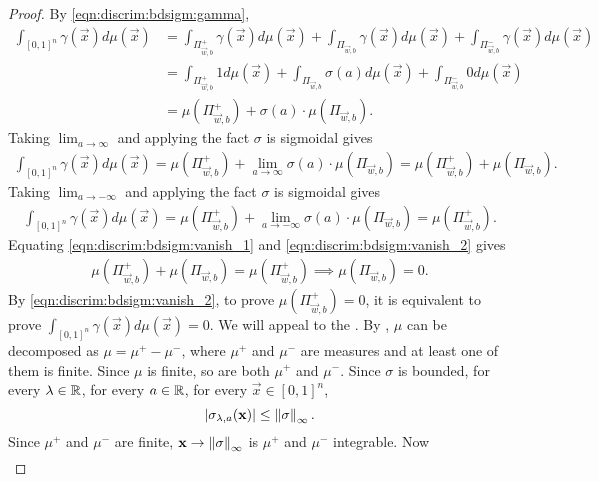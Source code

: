\begin{proof}
By \ref{eqn:discrim:bdsigm:gamma}, \begin{align*}
    \int_{[0,1]^n} \gamma(\vec{x}) d \mu  (\vec{x}) &= \int_{\Pi_{\vec{w}, b}^{+}} \gamma(\vec{x}) d \mu  (\vec{x})  + \int_{\Pi_{\vec{w}, b}} \gamma(\vec{x}) d \mu  (\vec{x})  + \int_{\Pi_{\vec{w}, b}^{-}} \gamma(\vec{x}) d \mu  (\vec{x})  & \\
                                                    &=\int_{\Pi_{\vec{w}, b}^{+}} 1 d \mu  (\vec{x})  + \int_{\Pi_{\vec{w}, b}} \sigma(a) d \mu  (\vec{x})  + \int_{\Pi_{\vec{w}, b}^{-}} 0 d \mu  (\vec{x})  & \\
                                                   &= \mu(\Pi_{\vec{w}, b}^{+}) + \sigma(a) \cdot \mu (\Pi_{\vec{w}, b}).
\end{align*}
Taking $\lim_{a \to \infty}$ and applying the fact $\sigma$ is sigmoidal gives
\begin{align}
      \label{eqn:discrim:bdsigm:vanish_1}
      \int_{[0,1]^n} \gamma(\vec{x}) d \mu  (\vec{x}) = \mu(\Pi_{\vec{w}, b}^{+}) + \lim_{a \to \infty} \sigma(a) \cdot \mu (\Pi_{\vec{w}, b}) = \mu(\Pi_{\vec{w}, b}^{+}) + \mu (\Pi_{\vec{w}, b}).
\end{align}
Taking $\lim_{a \to -\infty}$ and applying the fact $\sigma$ is sigmoidal gives
\begin{align}
      \label{eqn:discrim:bdsigm:vanish_2}
      \int_{[0,1]^n} \gamma(\vec{x}) d \mu  (\vec{x}) = \mu(\Pi_{\vec{w}, b}^{+}) + \lim_{a \to -\infty} \sigma(a) \cdot \mu (\Pi_{\vec{w}, b}) = \mu(\Pi_{\vec{w}, b}^{+}).
\end{align}
Equating \ref{eqn:discrim:bdsigm:vanish_1} and  \ref{eqn:discrim:bdsigm:vanish_2} gives
\begin{align}
     \mu(\Pi_{\vec{w}, b}^{+}) + \mu (\Pi_{\vec{w}, b}) = \mu(\Pi_{\vec{w}, b}^{+}) \implies \mu (\Pi_{\vec{w}, b}) = 0.
\end{align}
By \ref{eqn:discrim:bdsigm:vanish_2}, to prove $\mu(\Pi_{\vec{w}, b}^{+}) = 0$, it is equivalent to prove $\int_{[0,1]^n} \gamma(\vec{x}) d \mu  (\vec{x}) = 0$. We will appeal to the .
By , $\mu$ can be decomposed as $\mu = \mu^{+} - \mu^{-}$, where $\mu^{+}$ and $\mu^{-}$ are measures and at least one of them is finite. Since $\mu$ is finite, so are both $\mu^{+}$ and $\mu^{-}$. \newpage
Since $\sigma$ is bounded, for every $\lambda \in {\mathbb R}$, for every $a \in {\mathbb R}$, for every $\vec{x} \in [0,1]^n$,  \[ 
    |\sigma_{\lambda, a} (\mathbf{x})| \leq \left\lVert\sigma\right\rVert_\infty.
\]
Since $\mu^{+}$ and $\mu^{-}$ are finite, $\mathbf{x} \to \left\lVert\sigma\right\rVert_\infty$ is $\mu^{+}$ and $\mu^{-}$ integrable. Now \begin{align}

\end{align}
\end{proof}
